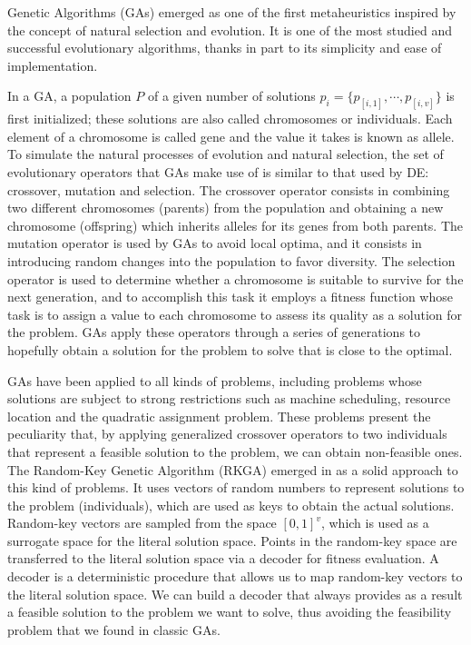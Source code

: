 \documentclass[review]{elsarticle}
\begin{document}
Genetic Algorithms (GAs) emerged as one of the first metaheuristics inspired by the concept of natural selection and evolution. It is one of the most studied and successful evolutionary algorithms, thanks in part to its simplicity and ease of implementation. \cite{fausto2019ants}

In a GA, a population $P$ of a given number of solutions $p_i = \{p_{[i,1]}, \cdots, p_{[i,v]}\}$ is first initialized; these solutions are also called chromosomes or individuals. Each element of a chromosome is called gene and the value it takes is known as allele. To simulate the natural processes of evolution and natural selection, the set of evolutionary operators that GAs make use of is similar to that used by DE: crossover, mutation and selection. The crossover operator consists in combining two different chromosomes (parents) from the population and obtaining a new chromosome (offspring) which inherits alleles for its genes from both parents. The mutation operator is used by GAs to avoid local optima, and it consists in introducing random changes into the population to favor diversity. The selection operator is used to determine whether a chromosome is suitable to survive for the next generation, and to accomplish this task it employs a fitness function whose task is to assign a value to each chromosome to assess its quality as a solution for the problem. GAs apply these operators through a series of generations to hopefully obtain a solution for the problem to solve that is close to the optimal. \cite{fausto2019ants}

GAs have been applied to all kinds of problems, including problems whose solutions are subject to strong restrictions such as machine scheduling, resource location and the quadratic assignment problem. These problems present the peculiarity that, by applying generalized crossover operators to two individuals that represent a feasible solution to the problem, we can obtain non-feasible ones. The Random-Key Genetic Algorithm (RKGA) emerged in \cite{bean1994genetic} as a solid approach to this kind of problems. It uses vectors of random numbers to represent solutions to the problem (individuals), which are used as keys to obtain the actual solutions. Random-key vectors are sampled from the space $[0,1]^{v}$, which is used as a surrogate space for the literal solution space. Points in the random-key space are transferred to the literal solution space via a decoder for fitness evaluation. A decoder is a deterministic procedure that allows us to map random-key vectors to the literal solution space. We can build a decoder that always provides as a result a feasible solution to the problem we want to solve, thus avoiding the feasibility problem that we found in classic GAs.
\end{document}
